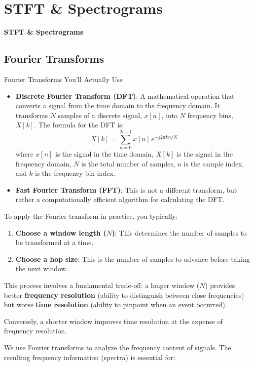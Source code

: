 \section{STFT \& Spectrograms}
\begin{frame}{}
    \LARGE \textbf{STFT \& Spectrograms}
\end{frame}

\subsection{Fourier Transforms}
\begin{frame}[allowframebreaks]{Fourier Transforms You'll Actually Use}
    \begin{itemize}
        \item \textbf{Discrete Fourier Transform (DFT)}: A mathematical operation that converts a signal from the time domain to the frequency domain. It transforms $N$ samples of a discrete signal, $x[n]$, into $N$ frequency bins, $X[k]$. The formula for the DFT is:
        $$X[k] = \sum_{n=0}^{N-1} x[n]\,e^{-j2\pi kn/N}$$
        where $x[n]$ is the signal in the time domain, $X[k]$ is the signal in the frequency domain, $N$ is the total number of samples, $n$ is the sample index, and $k$ is the frequency bin index.
        \item \textbf{Fast Fourier Transform (FFT)}: This is not a different transform, but rather a computationally efficient algorithm for calculating the DFT.
    \end{itemize}
\framebreak
    To apply the Fourier transform in practice, you typically:
    \begin{enumerate}
        \item \textbf{Choose a window length ($N$)}: This determines the number of samples to be transformed at a time.
        \item \textbf{Choose a hop size}: This is the number of samples to advance before taking the next window.
    \end{enumerate}
    This process involves a fundamental trade-off: a longer window ($N$) provides better \textbf{frequency resolution} (ability to distinguish between close frequencies) but worse \textbf{time resolution} (ability to pinpoint when an event occurred). 
    
    Conversely, a shorter window improves time resolution at the expense of frequency resolution.

\framebreak

    We use Fourier transforms to analyze the frequency content of signals. The resulting frequency information (spectra) is essential for:
    

\end{frame}
